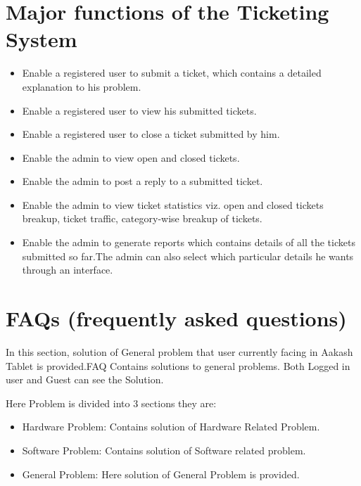 \documentclass[letterpaper,10pt,english]{sphinxmanual}
\begin{document}
\section{Major functions of the Ticketing System}
\label{unifieddoc:major-functions-of-the-ticketing-system}\begin{itemize}
\item {} 
Enable a registered user to submit a ticket, which contains a detailed explanation to his problem.

\item {} 
Enable a registered user to view his submitted tickets.

\item {} 
Enable a registered user to close a ticket submitted by him.

\item {} 
Enable the admin to view open and closed tickets.

\item {} 
Enable the admin to post a reply to a submitted ticket.

\item {} 
Enable the admin to view ticket statistics viz. open and closed tickets breakup, ticket traffic, category-wise breakup of tickets.

\item {} 
Enable the admin to generate reports which contains details of all the tickets submitted so far.The admin can also select which particular details he wants through an interface.

\end{itemize}


\section{FAQs (frequently asked questions)}
\label{unifieddoc:faqs-frequently-asked-questions}
In this section, solution of General problem that user currently facing in Aakash Tablet is provided.FAQ Contains solutions to general problems.
Both Logged in user and Guest can see the Solution.

Here Problem is divided into 3 sections they are:
\begin{itemize}
\item {} 
Hardware Problem: Contains solution of Hardware Related Problem.

\item {} 
Software Problem: Contains solution of Software related problem.

\item {} 
General Problem:   Here solution of General Problem is provided.

\end{itemize}
\end{document}
